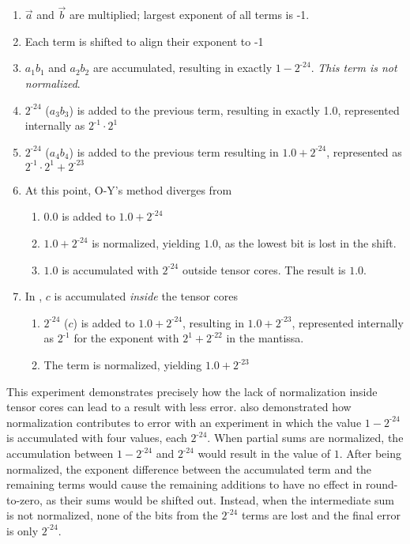 \begin{enumerate}
    \item $\vec{a}$ and $\vec{b}$ are multiplied; largest exponent of all terms is -1.
    \item Each term is shifted to align their exponent to -1
    \item $a_1b_1$ and $a_2b_2$ are accumulated, resulting in exactly $1-2^{\text{-24}}$. \textit{This term is not normalized}.
    \item $2^{\text{-}24}$ ($a_3b_3$) is added to the previous term, resulting in exactly 1.0, represented internally as $2^{\text{-}1}\cdot 2^1$
    \item $2^{\text{-}24}$ ($a_4b_4$) is added to the previous term resulting in $1.0 + 2^{\text{-}24}$, represented as $2^{\text{-}1} \cdot 2^1 + 2^{\text{-}23}$
    \item At this point, O-Y's method diverges from \citeauthor{markidis}
    \begin{enumerate}
        \item 0.0 is added to $1.0 + 2^{\text{-}24}$
        \item $1.0 + 2^{\text{-}24}$ is normalized, yielding $1.0$, as the lowest bit is lost in the shift.
        \item $1.0$ is accumulated with $2^{\text{-}24}$ outside tensor cores. The result is $1.0$.
    \end{enumerate}
    \item In \citeauthor{markidis}, $c$ is accumulated \textit{inside} the tensor cores
    \begin{enumerate}
        \item $2^{\text{-}24}$ ($c$) is added to $1.0 + 2^{\text{-}24}$, resulting in $1.0 + 2^{\text{-}23}$, represented internally as $2^{\text{-}1}$ for the exponent with $2^1 + 2^{\text{-}22}$ in the mantissa.
        \item The term is normalized, yielding $1.0+2^{\text{-}23}$
    \end{enumerate}
\end{enumerate}
This experiment demonstrates precisely how the lack of normalization inside tensor cores can lead to a result with less error.
\citet[\S D-2]{fasi2021numerical} also demonstrated how normalization contributes to error with an experiment in which the value $1-2^{\text{-}24}$ is accumulated with four values, each $2^{\text{-}24}$.  When partial sums are normalized, the accumulation between $1-2^{\text{-}24}$ and $2^{\text{-}24}$ would result in the value of $1$. After being normalized, the exponent difference between the accumulated term and the remaining terms would cause the remaining additions to have no effect in round-to-zero, as their sums would be shifted out.  Instead, when the intermediate sum is not normalized, none of the bits from the $2^{\text{-}24}$ terms are lost and the final error is only $2^{\text{-}24}$.